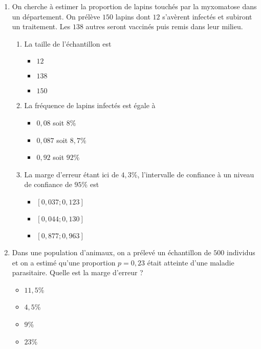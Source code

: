 \documentclass[11pt]{article}
\begin{document}
\begin{enumerate}
\begin{enumerate}
\begin{multicols}{3}
      \end{multicols}
  \end{enumerate}
\item On cherche à estimer la proportion de lapins touchés par la myxomatose
  dans un département. On prélève $150$ lapins dont $12$ s'avèrent infectés et
  subiront un traitement. Les $138$ autres seront vaccinés puis remis dans leur
  milieu.
  \begin{enumerate}
    \item La taille de l'échantillon est
      \begin{multicols}{3}
        \begin{itemize}[label=$\Box$]
          \item $12$
          \item $138$
          \item $150$
        \end{itemize}
      \end{multicols}
    \item  La fréquence de lapins infectés est égale à
      \begin{multicols}{3}
        \begin{itemize}[label=$\Box$]
          \item $0,08$ soit $8$\%
          \item $0,087$ soit $8,7$\%
          \item $0,92$ soit $92$\%
        \end{itemize}
      \end{multicols}
    \item La marge d'erreur étant ici de $4,3$\%, l'intervalle de confiance à un
      niveau de confiance de $95$\% est
      \begin{multicols}{3}
        \begin{itemize}[label=$\Box$]
          \item $\left[ 0,037 ; 0,123 \right]$
          \item $\left[ 0,044 ; 0,130 \right]$
          \item $\left[ 0,877 ; 0,963 \right]$
        \end{itemize}
      \end{multicols}
  \end{enumerate}
\item Dans une population d'animaux, on a prélevé un échantillon de $500$
  individus et on a estimé qu'une proportion $p=0,23$ était atteinte d'une
  maladie parasitaire. Quelle est la marge d'erreur ?
  \begin{multicols}{4}
    \begin{itemize}[label=$\Box$]
      \item $11,5$\%
      \item $4,5$\%
      \item $9$\%
      \item $23$\%
    \end{itemize}
  \end{multicols}
\end{enumerate}
\end{document}
